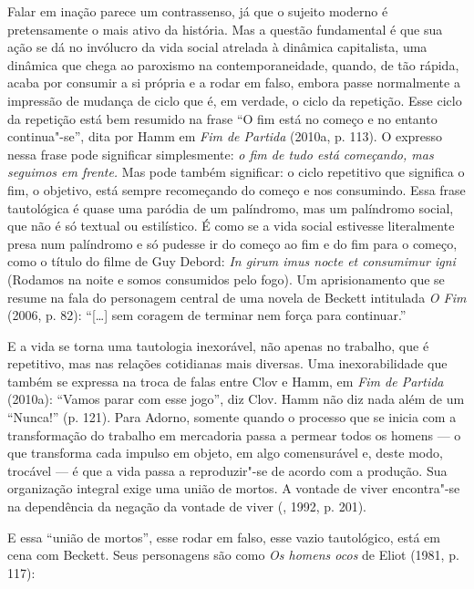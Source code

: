 Falar em inação parece um contrassenso, já que o sujeito moderno é
pretensamente o mais ativo da história. Mas a questão fundamental é que
sua ação se dá no invólucro da vida social atrelada à dinâmica
capitalista, uma dinâmica que chega ao paroxismo na contemporaneidade,
quando, de tão rápida, acaba por consumir a si própria e a rodar em
falso, embora passe normalmente a impressão de mudança de ciclo que é,
em verdade, o ciclo da repetição. Esse ciclo da repetição está bem
resumido na frase ``O fim está no começo e no entanto continua"-se'',
dita por Hamm em \emph{Fim de Partida} (2010a, p. 113). O
expresso nessa frase pode significar simplesmente: \emph{o fim de tudo
está começando, mas seguimos em frente.} Mas pode também significar: o
ciclo repetitivo que significa o fim, o objetivo, está sempre
recomeçando do começo e nos consumindo. Essa frase tautológica é quase
uma paródia de um palíndromo, mas um palíndromo social, que não é só
textual ou estilístico. É como se a vida social estivesse literalmente
presa num palíndromo e só pudesse ir do começo ao fim e do fim para o
começo, como o título do filme de Guy Debord:
\emph{In girum imus nocte et consumimur igni} (Rodamos na noite e somos
consumidos pelo fogo). Um aprisionamento que se resume na fala do
personagem central de uma novela de Beckett intitulada \emph{O Fim}
(2006, p. 82): ``[\ldots{}] sem coragem de terminar nem força para
continuar.''

E a vida se torna uma tautologia inexorável, não apenas no trabalho, que
é repetitivo, mas nas relações cotidianas mais diversas. Uma
inexorabilidade que também se expressa na troca de falas entre Clov e
Hamm, em \emph{Fim de Partida} (2010a): ``Vamos parar com esse jogo'',
diz Clov. Hamm não diz nada além de um ``Nunca!'' (p. 121). Para Adorno,
somente quando o processo que se inicia com a transformação do trabalho
em mercadoria passa a permear todos os homens --- o que transforma cada
impulso em objeto, em algo comensurável e, deste modo, trocável --- é que
a vida passa a reproduzir"-se de acordo com a produção. Sua organização
integral exige uma união de mortos. A vontade de viver encontra"-se na
dependência da negação da vontade de viver (, 1992, p. 201).

E essa ``união de mortos'', esse rodar em falso, esse vazio tautológico,
está em cena com Beckett. Seus personagens são como \emph{Os
homens ocos} de Eliot (1981, p. 117):

